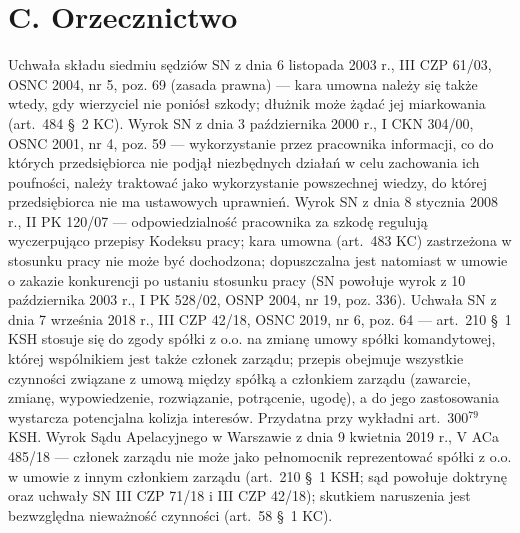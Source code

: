 \section*{C. Orzecznictwo}
\begin{BibList}
 Uchwała składu siedmiu sędziów SN z dnia 6 listopada 2003 r., III CZP 61/03, OSNC 2004, nr 5, poz. 69 (zasada prawna) --- kara umowna należy się także wtedy, gdy wierzyciel nie poniósł szkody; dłużnik może żądać jej miarkowania (art.~484 §~2 KC).
 Wyrok SN z dnia 3 października 2000 r., I CKN 304/00, OSNC 2001, nr 4, poz. 59 --- wykorzystanie przez pracownika informacji, co do których przedsiębiorca nie podjął niezbędnych działań w celu zachowania ich poufności, należy traktować jako wykorzystanie powszechnej wiedzy, do której przedsiębiorca nie ma ustawowych uprawnień.
 Wyrok SN z dnia 8 stycznia 2008 r., II PK 120/07 --- odpowiedzialność pracownika za szkodę regulują wyczerpująco przepisy Kodeksu pracy; kara umowna (art.~483 KC) zastrzeżona w stosunku pracy nie może być dochodzona; dopuszczalna jest natomiast w umowie o zakazie konkurencji po ustaniu stosunku pracy (SN powołuje wyrok z 10 października 2003 r., I PK 528/02, OSNP 2004, nr 19, poz. 336).
 Uchwała SN z dnia 7 września 2018 r., III CZP 42/18, OSNC 2019, nr 6, poz. 64 --- art.~210 §~1 KSH stosuje się do zgody spółki z o.o. na zmianę umowy spółki komandytowej, której wspólnikiem jest także członek zarządu; przepis obejmuje wszystkie czynności związane z umową między spółką a członkiem zarządu (zawarcie, zmianę, wypowiedzenie, rozwiązanie, potrącenie, ugodę), a do jego zastosowania wystarcza potencjalna kolizja interesów. Przydatna przy wykładni art.~300$^{79}$ KSH.
 Wyrok Sądu Apelacyjnego w Warszawie z dnia 9 kwietnia 2019 r., V ACa 485/18 --- członek zarządu nie może jako pełnomocnik reprezentować spółki z o.o. w umowie z innym członkiem zarządu (art.~210 §~1 KSH; sąd powołuje doktrynę oraz uchwały SN III CZP 71/18 i III CZP 42/18); skutkiem naruszenia jest bezwzględna nieważność czynności (art.~58 §~1 KC).
\end{BibList}

